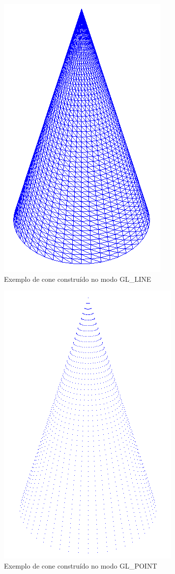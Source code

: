 \begin{figure}[<+htpb+>]
	\centering
	\includegraphics[scale=0.2]{imagens/p1_line.png}
	\caption{Exemplo de cone construído no modo GL\_LINE}
	\label{p1:fig:p1_line}
\end{figure}

\begin{figure}[<+htpb+>]
	\centering
	\includegraphics[scale=0.2]{imagens/p1_point.png}
	\caption{Exemplo de cone construído no modo GL\_POINT}
	\label{p1:fig:p1_point}
\end{figure}



